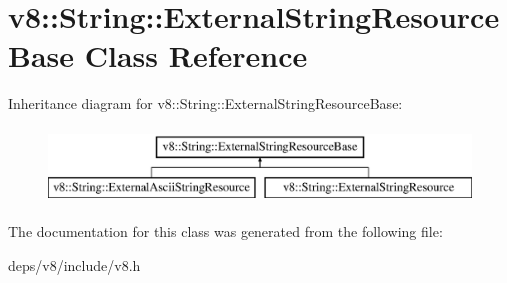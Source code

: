 \hypertarget{classv8_1_1_string_1_1_external_string_resource_base}{}\section{v8\+:\+:String\+:\+:External\+String\+Resource\+Base Class Reference}
\label{classv8_1_1_string_1_1_external_string_resource_base}
Inheritance diagram for v8\+:\+:String\+:\+:External\+String\+Resource\+Base\+:\begin{figure}[H]
\begin{center}
\leavevmode
\includegraphics[height=2.000000cm]{classv8_1_1_string_1_1_external_string_resource_base}
\end{center}
\end{figure}


The documentation for this class was generated from the following file\+:\begin{DoxyCompactItemize}
\item 
deps/v8/include/v8.\+h\end{DoxyCompactItemize}
